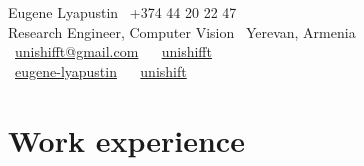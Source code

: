 \documentclass{tccv}
\begin{document}
{ Eugene Lyapustin} \hfill \faPhone~+374 44 20 22 47 \\
{\Large Research Engineer, Computer Vision} \hfill \faMapMarker~Yerevan, Armenia \\
\null\hfill\faEnvelope~\href{mailto:unishifft@gmail.com}{unishifft@gmail.com} ~ \faTelegramPlane~\href{https://t.me/unishifft}{unishifft}\\
\null\hfill \faLinkedin~\href{https://linkedin.com/in/eugene-lyapustin}{eugene-lyapustin} ~ \faGithub~\href{https://github.com/unishift/}{unishift}



\section{Work experience}
\end{document}
